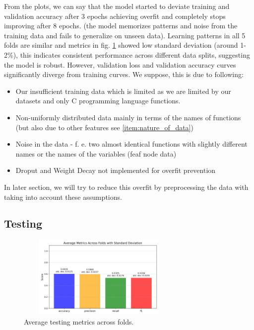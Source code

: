 \documentclass[10pt,english,a4paper]{report}
\begin{document}
From the plots, we can say that the model started to deviate training and 
validation accuracy after 3 epochs achieving overfit and completely stops improving after 8 epochs.
(the model memorizes patterns and noise from the training data and fails to generalize on unseen data).
Learning patterns in all 5 folds are similar and metrics in fig. \ref{fig:average_testing_metrics}
showed low standard deviation (around 1-2\%), this indicates consistent
performance across different data splits, suggesting the model is robust.
However, validation loss and validation accuracy curves significantly diverge from
training curves. We suppose, this is due to following:
\begin{itemize}

\item Our insufficient training data which is limited as we are limited by our datasets and only C programming language functions.
\item Non-uniformly distributed data mainly in terms of the names of functions (but also due to other features see \ref{item:nature_of_data})
\item Noise in the data - f. e. two almost identical functions with slightly different names or the names of the variables (feaf node data)
\item Droput and Weight Decay not implemented for overfit prevention


\end{itemize}

In later section, we will try to reduce this overfit by preprocessing the data 
with taking into account these assumptions.

\subsection{Testing}


\begin{figure}[H]
    \centering
    \includegraphics[width=8cm, height=4cm]{figures/testing/agg_average_metrics_plot.png}
    \caption{Average testing metrics across folds.}
    \label{fig:average_testing_metrics}
\end{figure}
\end{document}

